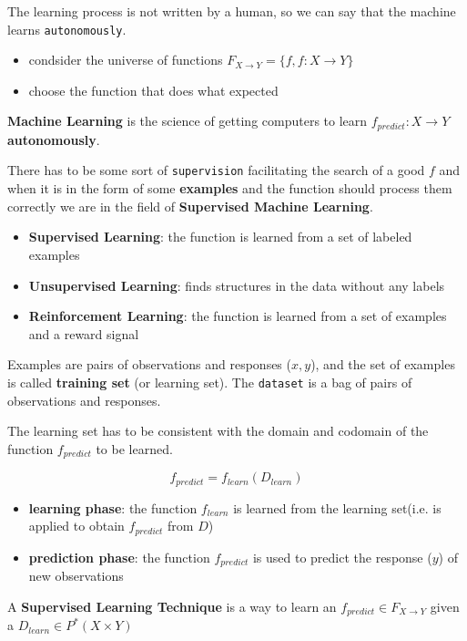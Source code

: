 The learning process is not written by a human, so we can say that the machine learns \texttt{autonomously}.
\begin{itemize}
    \item condsider the universe of functions $F_{X \to Y} = \{f, f:X \to Y\}$
    \item choose the function that does what expected
\end{itemize}

\begin{definitionblock}
\textbf{Machine Learning} is the science of getting computers to learn $f_{predict}:X \to Y$ \textbf{autonomously}.
\end{definitionblock}

There has to be some sort of \texttt{supervision} facilitating the search of a good $f$ and when it is in the form of some \textbf{examples} and the function should process them correctly we are in the field of \textbf{Supervised Machine Learning}.
\begin{itemize}
    \item \textbf{Supervised Learning}: the function is learned from a set of labeled examples
    \item \textbf{Unsupervised Learning}: finds structures in the data without any labels
    \item \textbf{Reinforcement Learning}: the function is learned from a set of examples and a reward signal
\end{itemize}

Examples are pairs of observations and responses ($x,y$), and the set of examples is called \textbf{training set} (or learning set). The \texttt{dataset} is a bag of pairs of observations and responses.

The learning set has to be consistent with the domain and codomain of the function $f_{predict}$ to be learned.

$$f_{predict} = f_{learn}(D_{learn})$$

\begin{itemize}
    \item \textbf{learning phase}: the function $f_{learn}$ is learned from the learning set(i.e. is applied to obtain $f_{predict}$ from $D$)
    \item \textbf{prediction phase}: the function $f_{predict}$ is used to predict the response ($y$) of new observations
\end{itemize}

\begin{definitionblock}
A \textbf{Supervised Learning Technique} is a way to learn an $f_{predict} \in F_{X\to Y}$ given a $D_{learn} \in P^{*}(X \times Y)$
\end{definitionblock}

